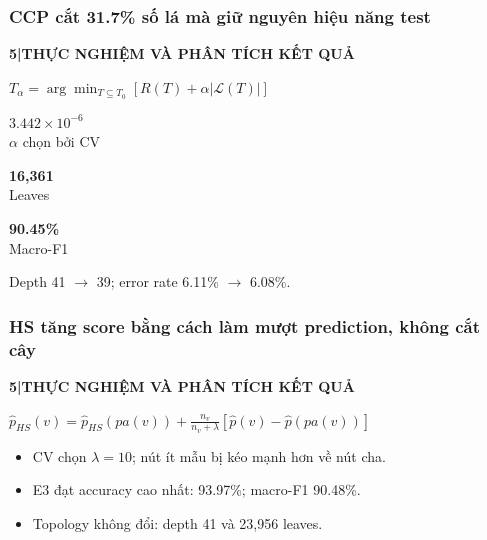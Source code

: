 \documentclass[aspectratio=169,12pt]{beamer}
\newcommand{\metric}[3]{%
  \begin{minipage}[t]{0.30\linewidth}
    \centering
    {\Large\bfseries\textcolor{#1}{#2}}\\[-0.15em]
    {\small #3}
  \end{minipage}%
}
\newcommand{\chaptertag}[2]{%
  \vspace{-0.16cm}%
  {\scriptsize\bfseries\textcolor{boxframe}{#1\enspace |\enspace #2}}\par
  \vspace{0.12cm}%
}
\begin{document}
\begin{frame}
  \frametitle{CCP cắt 31.7\% số lá mà giữ nguyên hiệu năng test}
  \chaptertag{5}{THỰC NGHIỆM VÀ PHÂN TÍCH KẾT QUẢ}
  \begin{tcolorbox}[focusbox,width=0.88\textwidth,top=3mm,bottom=3mm]
    \centering
    $\displaystyle T_{\alpha}=\arg\min_{T\subseteq T_0}
    \left[R(T)+\alpha|\mathcal{L}(T)|\right]$
  \end{tcolorbox}
  \vspace{0.35cm}
  \begin{center}
    \metric{boxframe}{$3.442\times10^{-6}$}{$\alpha$ chọn bởi CV}\hfill
    \metric{primaryblue}{16,361}{Leaves}\hfill
    \metric{successgreen}{90.45\%}{Macro-F1}
  \end{center}
  \vspace{0.30cm}
  \centering
  Depth 41 $\rightarrow$ 39; error rate 6.11\% $\rightarrow$ 6.08\%.
\end{frame}

\begin{frame}
  \frametitle{HS tăng score bằng cách làm mượt prediction, không cắt cây}
  \chaptertag{5}{THỰC NGHIỆM VÀ PHÂN TÍCH KẾT QUẢ}
  \begin{tcolorbox}[focusbox,width=0.91\textwidth,top=3mm,bottom=3mm]
    \centering
    $\displaystyle \hat p_{HS}(v)=\hat p_{HS}(pa(v))+
    \frac{n_v}{n_v+\lambda}[\hat p(v)-\hat p(pa(v))]$
  \end{tcolorbox}
  \vspace{0.35cm}
  \begin{itemize}
    \item CV chọn $\lambda=10$; nút ít mẫu bị kéo mạnh hơn về nút cha.
    \item E3 đạt accuracy cao nhất: 93.97\%; macro-F1 90.48\%.
    \item Topology không đổi: depth 41 và 23,956 leaves.
  \end{itemize}
\end{frame}
\end{document}

